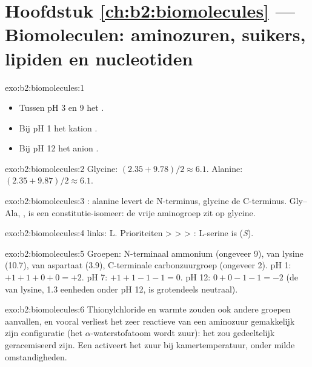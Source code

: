 \section*{Hoofdstuk \ref{ch:b2:biomolecules} --- Biomoleculen: aminozuren, suikers, lipiden en nucleotiden}

\begin{solution}{exo:b2:biomolecules:1}
\begin{itemize}
  \item Tussen pH 3 en 9 het  .
  \item Bij pH 1 het kation .
  \item Bij pH 12 het anion .
\end{itemize}
\end{solution}

\begin{solution}{exo:b2:biomolecules:2}
Glycine: $(2.35 + 9.78)/2 \approx 6.1$. Alanine: $(2.35 + 9.87)/2 \approx 6.1$.
\end{solution}

\begin{solution}{exo:b2:biomolecules:3}
: alanine levert de N-terminus, glycine de C-terminus. Gly--Ala,
, is een constitutie-isomeer: de vrije aminogroep zit op glycine.
\end{solution}

\begin{solution}{exo:b2:biomolecules:4}
 links: L. Prioriteiten  >  >  > : L-serine is
(\textit{S}).
\end{solution}

\begin{solution}{exo:b2:biomolecules:5}
Groepen: N-terminaal ammonium (ongeveer 9),  van lysine (10.7),  van aspartaat (3.9),
C-terminale carbonzuurgroep (ongeveer 2). pH 1: $+1 +1 + 0 + 0 = +2$. pH 7: $+1 +1 -1 -1 = 0$. pH 12:
$0 + 0 - 1 - 1 = -2$ (de  van lysine, 1.3 eenheden onder pH 12, is grotendeels neutraal).
\end{solution}

\begin{solution}{exo:b2:biomolecules:6}
Thionylchloride en warmte zouden ook andere groepen aanvallen, en vooral verliest het zeer reactieve 
van een aminozuur gemakkelijk zijn configuratie (het $\alpha$-waterstofatoom wordt zuur): het  zou
gedeeltelijk geracemiseerd zijn. Een  activeert het zuur bij kamertemperatuur, onder milde omstandigheden.
\end{solution}

